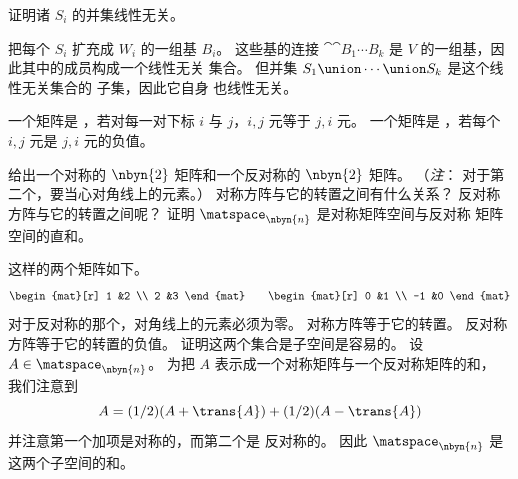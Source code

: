 \begin{exercises}
    证明诸 \( S_i \) 的并集线性无关。
    \begin{answer}
      把每个 \( S_i \) 扩充成 \( W_i \) 的一组基 $B_i$。
      这些基的连接 $\cat{\cat{B_1}{\cdots}}{B_k}$
      是 \( V \) 的一组基，因此其中的成员构成一个线性无关
      集合。
      但并集 $S_1\union\cdots\union S_k$ 是这个线性无关集合的
      子集，因此它自身
      也线性无关。  
     \end{answer}
  \item 
    一个矩阵是%
    ，若对每一对下标 \( i \) 与
    \( j \)，\( i,j \) 元等于 \( j,i \) 元。
    一个矩阵是%
    ，若每个 \( i,j \) 元是
    \( j,i \) 元的负值。
    \begin{exparts}
      \partsitem 给出一个对称的 $\nbyn{2}$ 矩阵和一个反对称的
        $\nbyn{2}$ 矩阵。
        （\textit{注}：
        对于第二个，要当心对角线上的元素。）
      \partsitem 对称方阵与它的转置之间有什么关系？
        反对称方阵与它的转置之间呢？
      \partsitem 证明 \( \matspace_{\nbyn{n}} \) 是对称矩阵空间与反对称
        矩阵空间的直和。
    \end{exparts}
    \begin{answer}
      \begin{exparts}
        \partsitem 这样的两个矩阵如下。
          \begin{equation*}
            \begin{mat}[r]
              1  &2  \\
              2  &3
            \end{mat}
            \qquad
            \begin{mat}[r]
              0  &1  \\
              -1 &0
            \end{mat}
          \end{equation*}
          对于反对称的那个，对角线上的元素必须为零。
        \partsitem 对称方阵等于它的转置。
          反对称方阵等于它的转置的负值。
        \partsitem 证明这两个集合是子空间是容易的。
         设 \( A\in\matspace_{\nbyn{n}} \)。
         为把 $A$ 表示成一个对称矩阵与一个反对称矩阵的和，
         我们注意到
         \begin{equation*}
            A=(1/2)(A+\trans{A}) + (1/2)(A-\trans{A})
         \end{equation*}
         并注意第一个加项是对称的，而第二个是
         反对称的。
         因此 \( \matspace_{\nbyn{n}} \) 是这两个子空间的和。

\end{exparts}
\end{answer}
\end{exercises}
